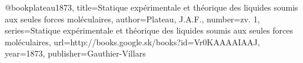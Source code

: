 @book{plateau1873,
  title={Statique exp{\'e}rimentale et th{\'e}orique des liquides soumis aux seules forces mol{\'e}culaires},
  author={Plateau, J.A.F.},
  number={zv. 1},
  series={Statique exp{\'e}rimentale et th{\'e}orique des liquides soumis aux seules forces mol{\'e}culaires},
  url={http://books.google.sk/books?id=Vr0KAAAAIAAJ},
  year={1873},
  publisher={Gauthier-Villars}
}
